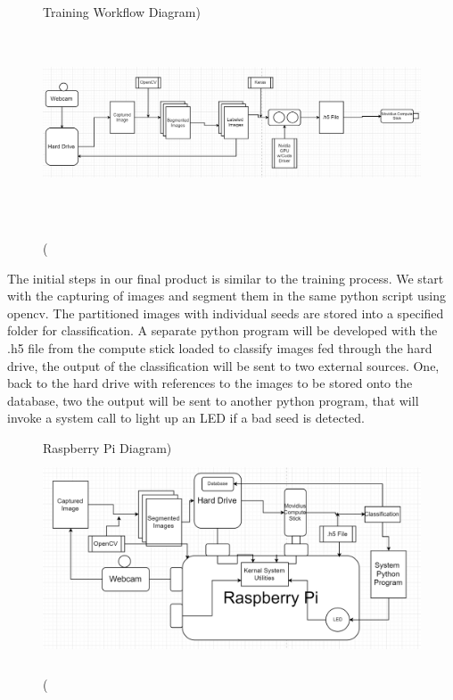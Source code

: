 \begin{figure}[h]
\caption(Training Workflow Diagram)
\centering
\includegraphics[height=6cm]{Trainingseeddiagram}
\end{figure}

The initial steps in our final product is similar to the training process. We start with the capturing of images and segment them in the same python script using opencv. The partitioned images with individual seeds are stored into a specified folder for classification. A separate python program will be developed with the .h5 file from the compute stick loaded to classify images fed through the hard drive, the output of the classification will be sent to two external sources. One, back to the hard drive with references to the images to be stored onto the database, two the output will be sent to another python program, that will invoke a system call to light up an LED if a bad seed is detected.

\begin{figure}[h]
\caption(Raspberry Pi Diagram)
\centering
\includegraphics[height=6cm]{Raspiseeddiagram}
\end{figure}
